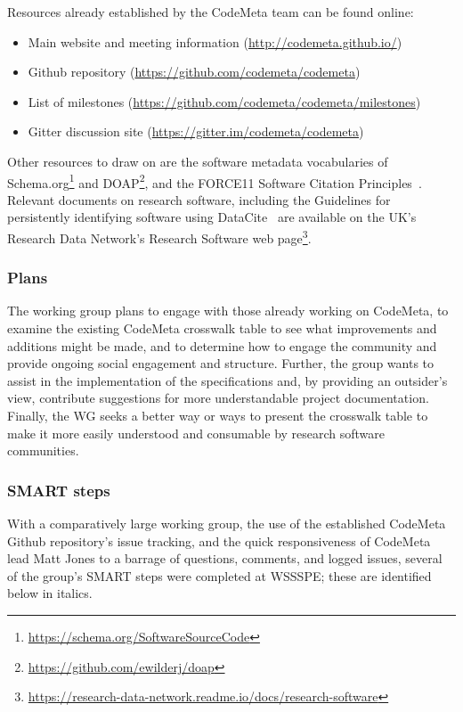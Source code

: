 Resources already established by the CodeMeta team can be found online:

\begin{itemize}
\item Main website and meeting information (\url{http://codemeta.github.io/})
\item Github repository (\url{https://github.com/codemeta/codemeta})
\item List of milestones (\url{https://github.com/codemeta/codemeta/milestones})
\item Gitter discussion site (\url{https://gitter.im/codemeta/codemeta})
\end {itemize}

Other resources to draw on are the software metadata vocabularies of Schema.org\footnote{\url{https://schema.org/SoftwareSourceCode}} and DOAP\footnote{\url{https://github.com/ewilderj/doap}}, and the FORCE11 Software Citation Principles~\cite{Smith:2016sc}. Relevant documents on research software, including the Guidelines for persistently identifying software using DataCite~\cite{Gent2015} are available on the UK's Research Data Network's Research Software web page\footnote{\url{https://research-data-network.readme.io/docs/research-software}}.

\subsubsection{Plans}

The working group plans to engage with those already working on CodeMeta, to examine the existing CodeMeta crosswalk table to see what improvements and additions might be made, and to determine how to engage the community and provide ongoing social engagement and structure. Further, the group wants to assist in the implementation of the specifications and, by providing an outsider's view, contribute suggestions for more understandable project documentation. Finally, the WG seeks a better way or ways to present the crosswalk table to make it more easily understood and consumable by research software communities.

\subsubsection{SMART steps}

With a comparatively large working group, the use of the established CodeMeta Github repository's issue tracking, and the quick responsiveness of CodeMeta lead Matt Jones to a barrage of questions, comments, and logged issues, several of the group's SMART steps were completed at WSSSPE; these are identified below in italics.

